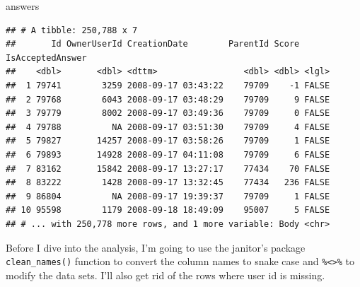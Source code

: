 \documentclass[]{article}
\newenvironment{Shaded}{\begin{snugshade}}{\end{snugshade}}
\newcommand{\KeywordTok}[1]{\textcolor[rgb]{0.13,0.29,0.53}{\textbf{#1}}}
\newcommand{\StringTok}[1]{\textcolor[rgb]{0.31,0.60,0.02}{#1}}
\newcommand{\OperatorTok}[1]{\textcolor[rgb]{0.81,0.36,0.00}{\textbf{#1}}}
\newcommand{\NormalTok}[1]{#1}
\begin{document}
\begin{Shaded}
\begin{Highlighting}[]
\NormalTok{answers }
\end{Highlighting}
\end{Shaded}

\begin{verbatim}
## # A tibble: 250,788 x 7
##       Id OwnerUserId CreationDate        ParentId Score IsAcceptedAnswer
##    <dbl>       <dbl> <dttm>                 <dbl> <dbl> <lgl>           
##  1 79741        3259 2008-09-17 03:43:22    79709    -1 FALSE           
##  2 79768        6043 2008-09-17 03:48:29    79709     9 FALSE           
##  3 79779        8002 2008-09-17 03:49:36    79709     0 FALSE           
##  4 79788          NA 2008-09-17 03:51:30    79709     4 FALSE           
##  5 79827       14257 2008-09-17 03:58:26    79709     1 FALSE           
##  6 79893       14928 2008-09-17 04:11:08    79709     6 FALSE           
##  7 83162       15842 2008-09-17 13:27:17    77434    70 FALSE           
##  8 83222        1428 2008-09-17 13:32:45    77434   236 FALSE           
##  9 86804          NA 2008-09-17 19:39:37    79709     1 FALSE           
## 10 95598        1179 2008-09-18 18:49:09    95007     5 FALSE           
## # ... with 250,778 more rows, and 1 more variable: Body <chr>
\end{verbatim}

Before I dive into the analysis, I'm going to use the janitor's package
\texttt{clean\_names()} function to convert the column names to snake
case and \texttt{\%\textless{}\textgreater{}\%} to modify the data sets.
I'll also get rid of the rows where user id is missing.

\begin{Shaded}
\end{Shaded}
\end{document}

